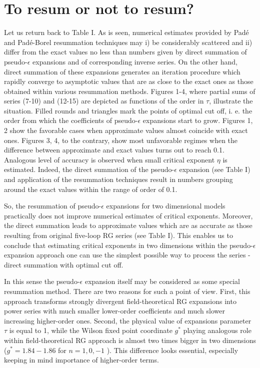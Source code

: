 \documentclass[aps,prb,preprint,showpacs,preprintnumbers,amsmath,amssymb]{revtex4}
\begin{document}
\section{To resum or not to resum?}

Let us return back to Table I. As is seen, numerical estimates provided by Pad\'e
and Pad\'e-Borel resummation techniques may i) be considerably scattered and
ii) differ from the exact values no less than numbers given by direct summation
of pseudo-$\epsilon$ expansions and of corresponding inverse series. On the other
hand, direct summation of these expansions generates an iteration procedure which
rapidly converge to asymptotic values that are as close to the exact ones as those
obtained within various resummation methods. Figures 1-4, where partial sums of
series (7-10) and (12-15) are depicted as functions of the order in $\tau$,
illustrate the situation. Filled rounds and triangles mark the points of optimal
cut off, i. e. the order from which the coefficients of pseudo-$\epsilon$ expansions
start to grow. Figures 1, 2 show the favorable cases when approximate values almost
coincide with exact ones. Figures 3, 4, to the contrary, show most unfavorable
regimes when the difference between approximate and exact values turns out to reach
0.1. Analogous level of accuracy is observed when small critical exponent $\eta$ is
estimated. Indeed, the direct summation of the pseudo-$\epsilon$ expansion (see
Table I) and application of the resummation techniques result in numbers grouping
around the exact values within the range of order of 0.1.

So, the resummation of pseudo-$\epsilon$ expansions for two dimensional models
practically does not improve numerical estimates of critical exponents. Moreover,
the direct summation leads to approximate values which are as accurate as those
resulting from original five-loop RG series (see Table I). This enables us to
conclude that estimating critical exponents in two dimensions within the
pseudo-$\epsilon$ expansion approach one can use the simplest possible way to
process the series - direct summation with optimal cut off.

In this sense the pseudo-$\epsilon$ expansion itself may be considered as some
special resummation method. There are two reasons for such a point of view. First,
this approach transforms strongly divergent field-theoretical RG expansions into
power series with much smaller lower-order coefficients and much slower increasing
higher-order ones. Second, the physical value of expansions parameter $\tau$ is
equal to 1, while the Wilson fixed point coordinate $g^*$ playing analogous role
within field-theoretical RG approach is almost two times bigger in two dimensions
($g^* = 1.84 - 1.86$ for $n = 1, 0, -1$ \cite{OS2000}). This difference looks
essential, especially keeping in mind importance of higher-order terms.
\end{document}
